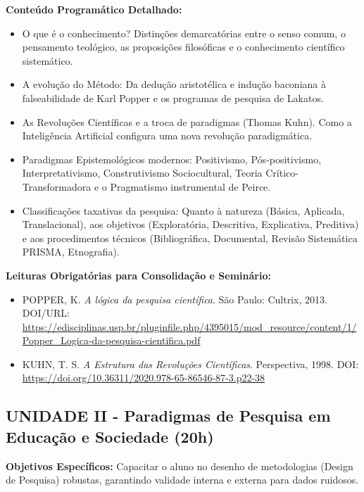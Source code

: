 \documentclass[12pt,a4paper]{article}
\begin{document}
\textbf{Conteúdo Programático Detalhado:}
\begin{itemize}
    \item O que é o conhecimento? Distinções demarcatórias entre o senso comum, o pensamento teológico, as proposições filosóficas e o conhecimento científico sistemático.
    \item A evolução do Método: Da dedução aristotélica e indução baconiana à falseabilidade de Karl Popper e os programas de pesquisa de Lakatos.
    \item As Revoluções Científicas e a troca de paradigmas (Thomas Kuhn). Como a Inteligência Artificial configura uma nova revolução paradigmática.
    \item Paradigmas Epistemológicos modernos: Positivismo, Pós-positivismo, Interpretativismo, Construtivismo Sociocultural, Teoria Crítico-Transformadora e o Pragmatismo instrumental de Peirce.
    \item Classificações taxativas da pesquisa: Quanto à natureza (Básica, Aplicada, Translacional), aos objetivos (Exploratória, Descritiva, Explicativa, Preditiva) e aos procedimentos técnicos (Bibliográfica, Documental, Revisão Sistemática PRISMA, Etnografia).
\end{itemize}

\textbf{Leituras Obrigatórias para Consolidação e Seminário:}
\begin{itemize}
    \item POPPER, K. \textit{A lógica da pesquisa científica}. São Paulo: Cultrix, 2013. DOI/URL: \url{https://edisciplinas.usp.br/pluginfile.php/4395015/mod_resource/content/1/Popper_Logica-da-pesquisa-cientifica.pdf}
    \item KUHN, T. S. \textit{A Estrutura das Revoluções Científicas}. Perspectiva, 1998. DOI: \url{https://doi.org/10.36311/2020.978-65-86546-87-3.p22-38}
\end{itemize}

\subsection{UNIDADE II - Paradigmas de Pesquisa em Educação e Sociedade (20h)}
\textbf{Objetivos Específicos:} Capacitar o aluno no desenho de metodologias (Design de Pesquisa) robustas, garantindo validade interna e externa para dados ruidosos.
\end{document}
